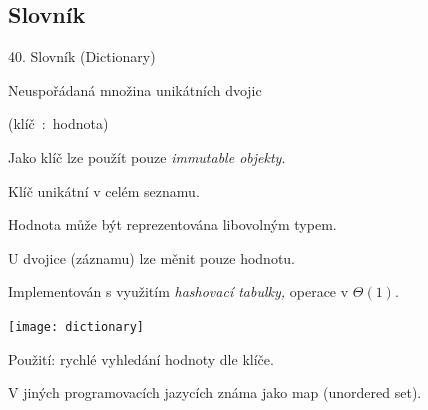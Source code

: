 \documentclass[czech]{beamer}
\newenvironment{lyxcode}
  {\par\begin{list}{}{
    \setlength{\rightmargin}{\leftmargin}
    \setlength{\listparindent}{0pt}%
    \raggedright
    \setlength{\itemsep}{0pt}
    \setlength{\parsep}{0pt}
    \normalfont\ttfamily}%
   \def\{{\char`\{}
   \def\}{\char`\}}
   \def\textasciitilde{\char`\~}
   \item[]}
  {\end{list}}
\begin{document}
\subsection{Slovník}
\begin{frame}{40. Slovník (Dictionary)}

{\footnotesize Neuspořádaná množina unikátních dvojic}{\footnotesize\par}
\begin{lyxcode}
{\footnotesize (klíč~:~hodnota)}{\footnotesize\par}
\end{lyxcode}
{\footnotesize Jako klíč lze použít pouze }{\footnotesize\emph{immutable
objekty}}{\footnotesize .}{\footnotesize\par}

{\footnotesize Klíč unikátní v celém seznamu.}{\footnotesize\par}

{\footnotesize Hodnota může být reprezentována libovolným typem.}{\footnotesize\par}

{\footnotesize U dvojice (záznamu) lze měnit pouze hodnotu.}{\footnotesize\par}

{\footnotesize\bigskip{}
}{\footnotesize\par}

{\footnotesize Implementován s využitím }{\footnotesize\emph{hashovací
tabulky,}}{\footnotesize{} operace }v $\varTheta(1)$.
\begin{center}
{\footnotesize\texttt{[image: dictionary]}}{\footnotesize\par}
\par\end{center}

{\footnotesize Použití: rychlé vyhledání hodnoty dle klíče.}{\footnotesize\par}

{\footnotesize V jiných programovacích jazycích známa jako map (unordered
set).}{\footnotesize\par}
\end{frame}
\end{document}
